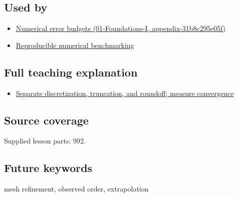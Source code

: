 \subsection{Used by}\label{appendix-aca80b6bf17a-used-by}

\begin{itemize}
\tightlist
\item
  \href{../01-Foundations-I/main.pdf\#nameddest=appendix-31b8c295e05f}{Numerical error budgets (01-Foundations-I, appendix-31b8c295e05f)}
\item
  \hyperref[appendix-b9db93e28371]{Reproducible numerical benchmarking}
\end{itemize}

\subsection{Full teaching explanation}\label{appendix-aca80b6bf17a-full-teaching-explanation}

\begin{itemize}
\tightlist
\item
  \hyperref[02-foundations-ii-ch029-separate-discretization-truncation-and-roundoff-measure-convergence]{Separate discretization, truncation, and roundoff; measure convergence}
\end{itemize}

\subsection{Source coverage}\label{appendix-aca80b6bf17a-source-coverage}

Supplied lesson parts: 992.

\subsection{Future keywords}\label{appendix-aca80b6bf17a-future-keywords}

mesh refinement, observed order, extrapolation
